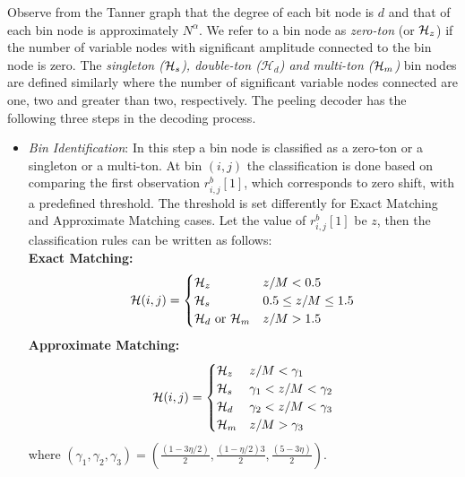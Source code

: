 \begin{enumerate}
	Observe from the Tanner graph that the degree of each bit node is $d$ and that of each bin node is approximately $N^{\alpha}$. 
We refer to a bin node as {\it zero-ton} (or $\mathcal{H}_z$) if the number of variable nodes with significant amplitude connected to the bin node is zero. The {\it singleton ($\mathcal{H}_s$), double-ton ($\mathcal{H}_d$) and multi-ton ($\mathcal{H}_m$)} bin nodes are defined similarly where the number of significant variable nodes connected are one, two and greater than two, respectively. The peeling decoder has the following three steps in the decoding process.\\

\begin{itemize}
\itemsep4pt
\item \textit{Bin Identification}: In this step a bin node is classified as a zero-ton or a singleton or a multi-ton. At bin $(i,j)$ the classification is done based on  comparing the first observation $r^{b}_{i,j}[1]$, which corresponds to zero shift, with a predefined threshold. The threshold is set differently for Exact Matching and Approximate Matching cases. Let the value of $r^{b}_{i,j}[1]$ be $z$, then the classification rules can be written as follows:\\
{\bf Exact Matching:} 
$$
\mathcal{H}(i,j)=
\begin{cases}
\mathcal{H}_z &  		z/M < 0.5 \\
\mathcal{H}_s &	 0.5 \leq z/M \leq 1.5 \\ 
\mathcal{H}_d \text{ or } \mathcal{H}_m  &       z/M > 1.5
\end{cases}
$$
{\bf Approximate Matching:} 
$$
\mathcal{H}(i,j)=
\begin{cases}
\mathcal{H}_z &  	 z/M < \gamma_1\\
\mathcal{H}_s &	  \gamma_1 < z/M < \gamma_2  \\
\mathcal{H}_d  &    \gamma_2  < z/M <  \gamma_3\\ 
\mathcal{H}_m &      z/M > \gamma_3\\
\end{cases}
$$ 
where $(\gamma_1,\gamma_2,\gamma_3)=(\frac{(1-3\eta/2)}{2},\frac{(1-\eta/2)3}{2},\frac{(5-3\eta)}{2})$.
			   

\end{itemize}
\end{enumerate}
